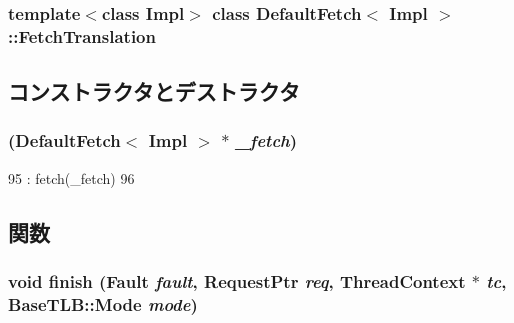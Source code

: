 \subsubsection*{template$<$class Impl$>$ class DefaultFetch$<$ Impl $>$::FetchTranslation}



\subsection{コンストラクタとデストラクタ}
\hypertarget{classDefaultFetch_1_1FetchTranslation_a29f6356ec0deaed2e91844473a66b4ed}{
\subsubsection[{FetchTranslation}]{ ({\bf DefaultFetch}$<$ Impl $>$ $\ast$ {\em \_\-fetch})}}
\label{classDefaultFetch_1_1FetchTranslation_a29f6356ec0deaed2e91844473a66b4ed}



\begin{DoxyCode}
95             : fetch(_fetch)
96         {}
\end{DoxyCode}


\subsection{関数}
\hypertarget{classDefaultFetch_1_1FetchTranslation_a01e7d945def8d2e5df87a169954fa89f}{
\subsubsection[{finish}]{\setlength{\rightskip}{0pt plus 5cm}void finish ({\bf Fault} {\em fault}, \/  {\bf RequestPtr} {\em req}, \/  {\bf ThreadContext} $\ast$ {\em tc}, \/  {\bf BaseTLB::Mode} {\em mode})}}
\label{classDefaultFetch_1_1FetchTranslation_a01e7d945def8d2e5df87a169954fa89f}


